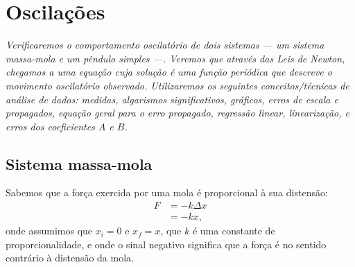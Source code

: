 \chapter{Oscilações}
\label{Chap:ExpOscilacoes}

\begin{fullwidth}\it
	Verificaremos o comportamento oscilatório de dois sistemas --- um sistema massa-mola e um pêndulo simples ---. Veremos que através das Leis de Newton, chegamos a uma equação cuja solução é uma função periódica que descreve o movimento oscilatório observado. Utilizaremos os seguintes conceitos/técnicas de análise de dados: medidas, algarismos significativos, gráficos, erros de escala e propagados, equação geral para o erro propagado, regressão linear, linearização, e erros dos coeficientes $A$ e $B$.
\end{fullwidth}

\section{Sistema massa-mola}

Sabemos que a força exercida por uma mola é proporcional à sua distensão:
\begin{align}
	F &= -k\Delta x \\
	&= -kx,
\end{align}
%
onde assumimos que $x_i = 0$ e $x_f = x$, que $k$ é uma constante de proporcionalidade, e onde o sinal negativo significa que a força é no sentido contrário à distensão da mola.

